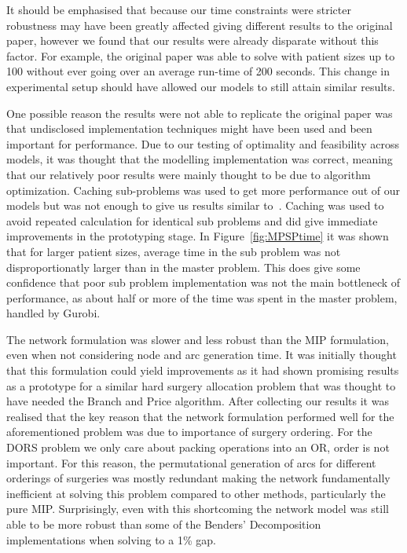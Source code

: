 It should be emphasised that because our time constraints were stricter robustness may have been greatly affected giving different results to the original paper, however we found that our results were already disparate without this factor. For example, the original paper was able to solve with patient sizes up to 100 without ever going over an average run-time of 200 seconds. This change in experimental setup should have allowed our models to still attain similar results.

One possible reason the results were not able to replicate the original paper was that undisclosed implementation techniques might have been used and been important for performance. Due to our testing of optimality and feasibility across models, it was thought that the modelling implementation was correct, meaning that our relatively poor results were mainly thought to be due to algorithm optimization. Caching sub-problems was used to get more performance out of our models but was not enough to give us results similar to~\cite{roshanaei2017propagating}. Caching was used to avoid repeated calculation for identical sub problems and did give immediate improvements in the prototyping stage. In Figure~\ref{fig:MPSPtime} it was shown that for larger patient sizes, average time in the sub problem was not disproportionatly larger than in the master problem. This does give some confidence that poor sub problem implementation was not the main bottleneck of performance, as about half or more of the time was spent in the master problem, handled by Gurobi. 

The network formulation was slower and less robust than the MIP formulation, even when not considering node and arc generation time. It was initially thought that this formulation could yield improvements as it had shown promising results as a prototype for a similar hard surgery allocation problem that was thought to have needed the Branch and Price algorithm\cite{DoulabiBranchPriceOR}. After collecting our results it was realised that the key reason that the network formulation performed well for the aforementioned problem was due to importance of surgery ordering. For the DORS problem we only care about packing operations into an OR, order is not important. For this reason, the permutational generation of arcs for different orderings of surgeries was mostly redundant making the network fundamentally inefficient at solving this problem compared to other methods, particularly the pure MIP. Surprisingly, even with this shortcoming the network model was still able to be more robust than some of the Benders' Decomposition implementations when solving to a 1\% gap.

